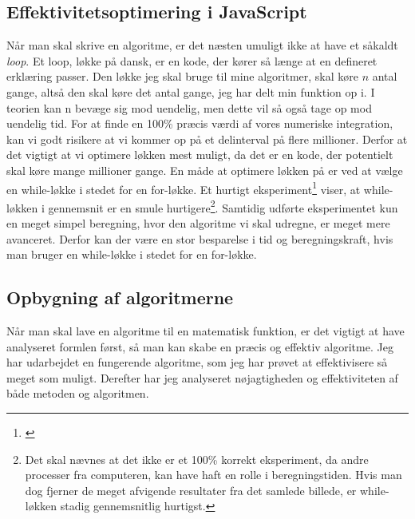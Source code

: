 \documentclass[12pt]{article}
\numberwithin{equation}{section}
\begin{document}
\subsection{Effektivitetsoptimering i JavaScript}
Når man skal skrive en algoritme, er det næsten umuligt ikke at have et såkaldt \emph{loop}. Et loop, løkke på dansk, er en kode, der kører så længe at en defineret erklæring passer. Den løkke jeg skal bruge til mine algoritmer, skal køre $n$ antal gange, altså den skal køre det antal gange, jeg har delt min funktion op i. I teorien kan n bevæge sig mod uendelig, men dette vil så også tage op mod uendelig tid. For at finde en 100\% præcis værdi af vores numeriske integration, kan vi godt risikere at vi kommer op på et delinterval på flere millioner. Derfor at det vigtigt at vi optimere løkken mest muligt, da det er en kode, der potentielt skal køre mange millioner gange. En måde at optimere løkken på er ved at vælge en while-løkke i stedet for en for-løkke. Et hurtigt eksperiment\footnote{\cite{forvswhile}} viser, at while-løkken i gennemsnit er en smule hurtigere\footnote{Det skal nævnes at det ikke er et 100\% korrekt eksperiment, da andre processer fra computeren, kan have haft en rolle i beregningstiden. Hvis man dog fjerner de meget afvigende resultater fra det samlede billede, er while-løkken stadig gennemsnitlig hurtigst.}. Samtidig udførte eksperimentet kun en meget simpel beregning, hvor den algoritme vi skal udregne, er meget mere avanceret. Derfor kan der være en stor besparelse i tid og beregningskraft, hvis man bruger en while-løkke i stedet for en for-løkke.


\subsection{Opbygning af algoritmerne}
Når man skal lave en algoritme til en matematisk funktion, er det vigtigt at have analyseret formlen først, så man kan skabe en præcis og effektiv algoritme. Jeg har udarbejdet en fungerende algoritme, som jeg har prøvet at effektivisere så meget som muligt. Derefter har jeg analyseret nøjagtigheden og effektiviteten af både metoden og algoritmen.
\end{document}
